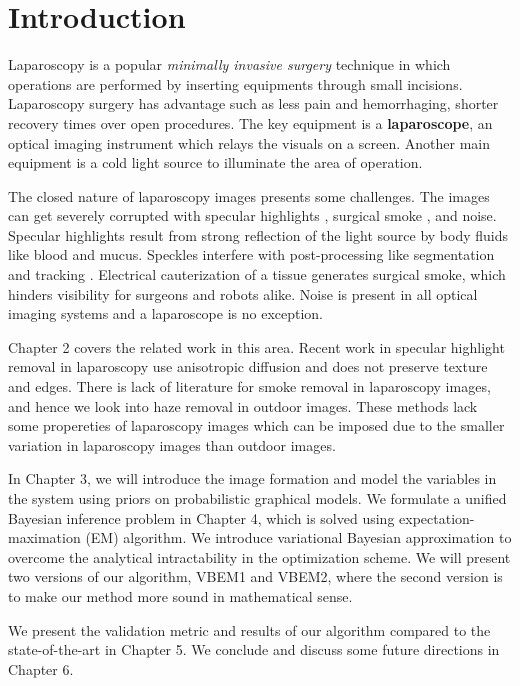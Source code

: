 
\newcommand{\etas}{\ensuremath{\eta_{\mathrm{s}}}}


\chapter{Introduction}

Laparoscopy is a popular \textit{minimally invasive surgery} technique in which operations are performed by inserting equipments through small incisions. Laparoscopy surgery has advantage such as less pain and hemorrhaging, shorter recovery times over open procedures. The key equipment is a \textbf{laparoscope}, an optical imaging instrument which relays the visuals on a screen. Another main equipment is a cold light source to illuminate the area of operation.

The closed nature of laparoscopy images presents some challenges. The images can get severely corrupted with specular highlights \cite{stoyanov2005removing, saint2011detection}, surgical smoke \cite{barrett2003surgical}, and noise. Specular highlights result from strong reflection of the light source by body fluids like blood and mucus. Speckles interfere with post-processing like segmentation \cite{prokopetc2015segmentation, voros2007segmentation} and tracking \cite{wolf2011tracking}. Electrical cauterization of a tissue generates surgical smoke, which hinders visibility for surgeons and robots alike. Noise is present in all optical imaging systems and a laparoscope is no exception.

Chapter 2 covers the related work in this area. Recent work in specular highlight removal in laparoscopy use anisotropic diffusion and does not preserve texture and edges. There is lack of literature for smoke removal in laparoscopy images, and hence we look into haze removal in outdoor images. These methods lack some propereties of laparoscopy images which can be imposed due to the smaller variation in laparoscopy images than outdoor images.

In Chapter 3, we will introduce the image formation and model the variables in the system using priors on probabilistic graphical models. We formulate a unified Bayesian inference problem in Chapter 4, which is solved using expectation-maximation (EM) algorithm. We introduce variational Bayesian approximation to overcome the analytical intractability in the optimization scheme. We will present two versions of our algorithm, VBEM1 and VBEM2, where the second version is to make our method more sound in mathematical sense.

We present the validation metric and results of our algorithm compared to the state-of-the-art in Chapter 5. We conclude and discuss some future directions in Chapter 6.







